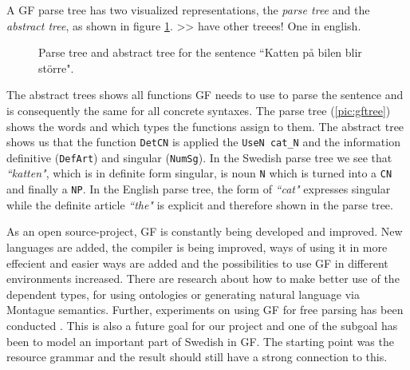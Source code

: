 \documentclass{report}
\begin{document}
A GF parse tree has two visualized representations, the \textit{parse tree} and
the \textit{abstract tree}, as shown in figure \ref{fig:gfPandAtrees}.
>> have other treees! One in english.
\begin{figure}[h]
\centering
{}
\caption{Parse tree and abstract tree for the sentence ``Katten på bilen blir större".}
\label{fig:gfPandAtrees}
\end{figure}
The abstract trees shows all functions GF needs to use
to parse the sentence and is consequently the same for all concrete syntaxes.
The parse tree (\ref{pic:gftree}) shows the words and which types the functions assign
to them.
The abstract tree shows us that the function
\verb_DetCN_ is applied the \verb-UseN cat_N- and the information
definitive (\verb-DefArt-) and singular (\verb-NumSg-). In the Swedish parse tree
we see that \emph{``katten"}, which is in definite form singular, is noun \verb-N-
which is turned into a \verb-CN- and finally a \verb-NP-. In the English parse
tree, the form of \emph{``cat"} expresses singular while the definite article
\emph{``the"} is explicit and therefore shown in the parse tree.

\vspace{5mm}
As an open source-project, GF is constantly being developed and improved. New
languages are added, the compiler is being improved, ways of using it in more 
effecient and easier ways are added
and the possibilities to use GF in different environments
increased. There are  research about how to make better use of the dependent
types, for using ontologies\cite{ramona} or generating natural
language via Montague semantics\cite{montague}.
Further, experiments on using GF for free parsing has been conducted
\cite[]{gfMech}.
This is also a future goal for our project and one of the subgoal has been to
model an important part of Swedish in GF. The starting point was the resource
grammar and the result should still have a strong connection to this.
\end{document}
